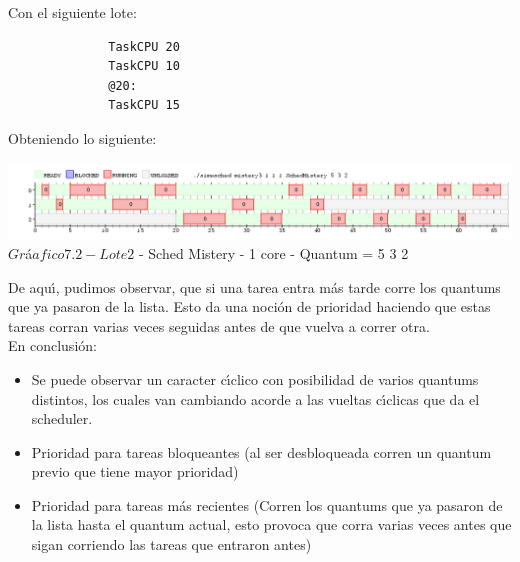 Con el siguiente lote:\\

\begin{verbatim}
              TaskCPU 20
              TaskCPU 10
              @20:
              TaskCPU 15
\end{verbatim}

Obteniendo lo siguiente:\\
\begin{center}
    	\includegraphics[width=450pt]{./Test/ej7_3.png}
	{$Gr$\'a$afico 7.2 - Lote 2$ - Sched Mistery - 1 core - Quantum = 5 3 2}	
 \end{center}
 
De aqu\'{\i}, pudimos observar, que si una tarea entra m\'{a}s tarde corre los quantums que ya pasaron de la lista. Esto da 
una noci\'{o}n de prioridad haciendo que estas tareas corran varias veces seguidas antes de que vuelva a correr otra.\\

\indent En conclusi\'on:\\


\begin{itemize}
 \item Se puede observar un caracter c\'{\i}clico con posibilidad de varios quantums distintos, los cuales van cambiando
 acorde a las vueltas c\'{\i}clicas que da el scheduler.
 \item Prioridad para tareas bloqueantes (al ser desbloqueada corren un quantum previo que tiene mayor prioridad)
 \item Prioridad para tareas m\'as recientes (Corren los quantums que ya pasaron de la lista hasta el quantum actual, esto 
 provoca que corra varias veces antes que sigan corriendo las tareas que entraron antes)
\end{itemize}

